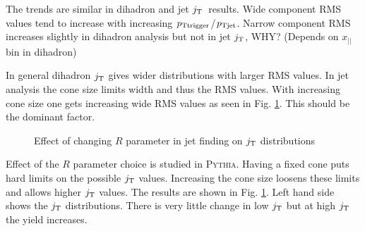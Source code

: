 The trends are similar in dihadron and jet $\jt{}$ results. Wide component RMS values tend to increase with increasing $p_{\rm Ttrigger}$/$p_{\rm Tjet}$. Narrow component RMS increases slightly in dihadron analysis but not in jet $\jt{}$, WHY? (Depends on $x_{||}$ bin in dihadron)

In general dihadron $\jt{}$ gives wider distributions with larger RMS values. In jet analysis the cone size limits width and thus the RMS values. With increasing cone size one gets increasing wide RMS values as seen in Fig. \ref{fig:Rcomparison}. This should be the dominant factor.

\begin{figure}[htp]
\centering
{}
\caption[\textsc{Pythia} $R$ parameters $\jt{}$]{Effect of changing $R$ parameter in jet finding on $\jt{}$ distributions}
\label{fig:Rcomparison}
\end{figure}


Effect of the $R$ parameter choice is studied in \textsc{Pythia}. Having a fixed cone puts hard limits on the possible $\jt{}$ values. Increasing the cone size loosens these limits and allows higher $\jt{}$ values. The results are shown in Fig. \ref{fig:Rcomparison}. Left hand side shows the $\jt{}$ distributions. There is very little change in low $\jt{}$ but at high $\jt{}$ the yield increases.

